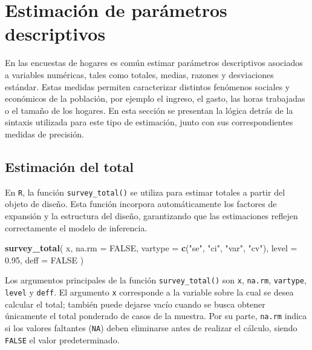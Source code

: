 \documentclass[
  spanish,
  12pt,
]{book}
\newenvironment{Shaded}{\begin{snugshade}}{\end{snugshade}}
\newcommand{\AttributeTok}[1]{\textcolor[rgb]{0.13,0.29,0.53}{#1}}
\newcommand{\ConstantTok}[1]{\textcolor[rgb]{0.56,0.35,0.01}{#1}}
\newcommand{\FloatTok}[1]{\textcolor[rgb]{0.00,0.00,0.81}{#1}}
\newcommand{\FunctionTok}[1]{\textcolor[rgb]{0.13,0.29,0.53}{\textbf{#1}}}
\newcommand{\NormalTok}[1]{#1}
\newcommand{\StringTok}[1]{\textcolor[rgb]{0.31,0.60,0.02}{#1}}
\begin{document}
\section{Estimación de parámetros descriptivos}\label{estimacion-de-parametros-descriptivos}

En las encuestas de hogares es común estimar parámetros descriptivos asociados a variables numéricas, tales como totales, medias, razones y desviaciones estándar. Estas medidas permiten caracterizar distintos fenómenos sociales y económicos de la población, por ejemplo el ingreso, el gasto, las horas trabajadas o el tamaño de los hogares. En esta sección se presentan la lógica detrás de la sintaxis utilizada para este tipo de estimación, junto con sus correspondientes medidas de precisión.

\subsection{Estimación del total}\label{estimacion-del-total}

En \texttt{R}, la función \texttt{survey\_total()} se utiliza para estimar totales a partir del objeto de diseño. Esta función incorpora automáticamente los factores de expansión y la estructura del diseño, garantizando que las estimaciones reflejen correctamente el modelo de inferencia.

\begin{Shaded}
\begin{Highlighting}[]
\FunctionTok{survey\_total}\NormalTok{(}
\NormalTok{  x,}
  \AttributeTok{na.rm =} \ConstantTok{FALSE}\NormalTok{,}
  \AttributeTok{vartype =} \FunctionTok{c}\NormalTok{(}\StringTok{"se"}\NormalTok{, }\StringTok{"ci"}\NormalTok{, }\StringTok{"var"}\NormalTok{, }\StringTok{"cv"}\NormalTok{),}
  \AttributeTok{level =} \FloatTok{0.95}\NormalTok{,}
  \AttributeTok{deff =} \ConstantTok{FALSE}
\NormalTok{)}
\end{Highlighting}
\end{Shaded}

Los argumentos principales de la función \texttt{survey\_total()} son \texttt{x}, \texttt{na.rm}, \texttt{vartype}, \texttt{level} y \texttt{deff}. El argumento \texttt{x} corresponde a la variable sobre la cual se desea calcular el total; también puede dejarse vacío cuando se busca obtener únicamente el total ponderado de casos de la muestra. Por su parte, \texttt{na.rm} indica si los valores faltantes (\texttt{NA}) deben eliminarse antes de realizar el cálculo, siendo \texttt{FALSE} el valor predeterminado.
\end{document}
